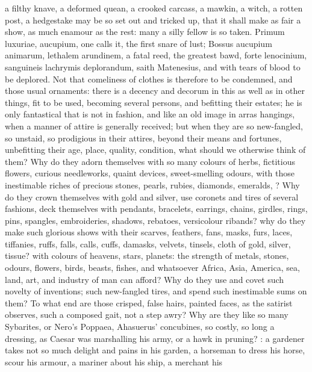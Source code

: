 {a filthy knave, a deformed quean, a crooked carcass, a mawkin, a witch,
a rotten post, a hedgestake may be so set out and tricked up, that it
shall make as fair a show, as much enamour as the rest: many a silly
fellow is so taken. Primum luxuriae, aucupium, one calls it, the first
snare of lust; Bossus aucupium animarum, lethalem arundinem, a
fatal reed, the greatest bawd, forte lenocinium, sanguineis lachrymis
deplorandum, saith Matenesius, and with tears of blood to be
deplored. Not that comeliness of clothes is therefore to be condemned,
and those usual ornaments: there is a decency and decorum in this as
well as in other things, fit to be used, becoming several persons, and
befitting their estates; he is only fantastical that is not in fashion,
and like an old image in arras hangings, when a manner of attire is
generally received; but when they are so new-fangled, so unstaid, so
prodigious in their attires, beyond their means and fortunes,
unbefitting their age, place, quality, condition, what should we
otherwise think of them? Why do they adorn themselves with so many
colours of herbs, fictitious flowers, curious needleworks, quaint
devices, sweet-smelling odours, with those inestimable riches of
precious stones, pearls, rubies, diamonds, emeralds, \etc{}? Why do they
crown themselves with gold and silver, use coronets and tires of
several fashions, deck themselves with pendants, bracelets, earrings,
chains, girdles, rings, pins, spangles, embroideries, shadows,
rebatoes, versicolour ribands? why do they make such glorious shows
with their scarves, feathers, fans, masks, furs, laces, tiffanies,
ruffs, falls, calls, cuffs, damasks, velvets, tinsels, cloth of gold,
silver, tissue? with colours of heavens, stars, planets: the strength
of metals, stones, odours, flowers, birds, beasts, fishes, and
whatsoever Africa, Asia, America, sea, land, art, and industry of man
can afford? Why do they use and covet such novelty of inventions; such
new-fangled tires, and spend such inestimable sums on them? To what end
are those crisped, false hairs, painted faces, as the satirist
observes, such a composed gait, not a step awry? Why are they like so
many Sybarites, or Nero's Poppaea, Ahasuerus' concubines, so costly, so
long a dressing, as Caesar was marshalling his army, or a hawk in
pruning? : a gardener
takes not so much delight and pains in his garden, a horseman to dress
his horse, scour his armour, a mariner about his ship, a merchant his
}
